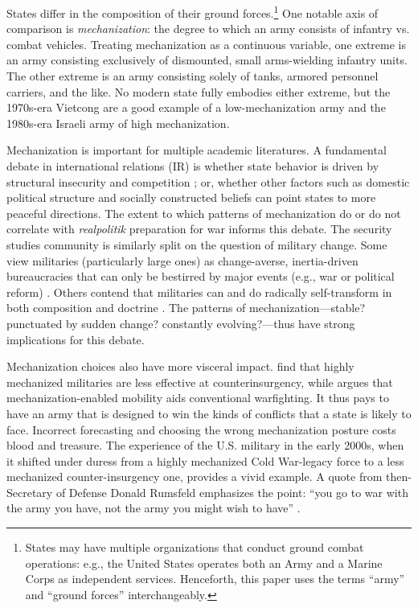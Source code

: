 \documentclass{article}
\begin{document}
States differ in the composition of their ground forces.\footnote{States may have multiple organizations that
conduct ground combat operations: e.g., the United States operates both an Army
and a Marine Corps as independent services. Henceforth, this paper uses the
terms ``army'' and ``ground forces'' interchangeably.} One notable axis of comparison 
is \textit{mechanization}: the degree to which an army consists of infantry 
vs. combat vehicles. Treating mechanization as a continuous variable, 
one extreme is an army consisting exclusively of dismounted, small 
arms-wielding infantry units. The other extreme is an army consisting 
solely of tanks, armored personnel carriers, and the like.
No modern state fully embodies either extreme, but the 1970s-era Vietcong are
a good example of a low-mechanization army and the 1980s-era Israeli army of
high mechanization.

Mechanization is important for multiple academic literatures. A
fundamental debate in international relations (IR) is whether state
behavior is driven by structural insecurity and 
competition \citep{waltz2001man, mearsheimer2001tragedy}; or, whether other
factors such as domestic political structure \citep{russett1994grasping} and
socially constructed beliefs \citep{wendt1992anarchy} can point states to more peaceful directions. 
The extent to which patterns of mechanization do or do not correlate with
\textit{realpolitik} preparation for war informs this debate.
The security studies community is similarly split on the question of military
change. Some view militaries (particularly large ones) as change-averse, 
inertia-driven bureaucracies that can only be bestirred by major events (e.g.,
war or political reform)
\citep{posen1986sources,zegart2000flawed,locher2004victory,halperin2007bureaucratic}. 
Others contend that militaries can and do radically self-transform in both composition and doctrine
\citep{murray1998military,adamsky2010culture}. The patterns of
mechanization---stable? punctuated by sudden change? constantly evolving?---thus
have strong implications for this debate.

Mechanization choices also have more visceral impact.
\citet{lyall2009rage} find that highly mechanized militaries are less effective
at counterinsurgency, while \citet{biddle2004military} argues that
mechanization-enabled mobility aids conventional warfighting. It thus
pays to have an army that is designed to win the kinds of conflicts that a state is 
likely to face. Incorrect forecasting and choosing the wrong mechanization
posture costs blood and treasure. The experience of the U.S. military in the early
2000s, when it shifted under duress from a highly mechanized Cold War-legacy force to a less
mechanized counter-insurgency one, provides a vivid example. A quote from then-Secretary of Defense 
Donald Rumsfeld emphasizes the point:
``you go to war with the army you have, not the army you might wish to have'' \citep{schmitt_2004}. 
\end{document}
